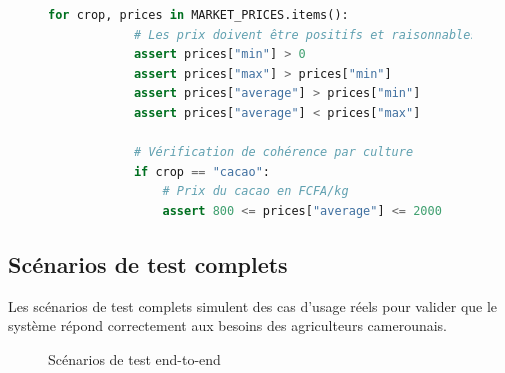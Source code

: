 \begin{figure}[H]
\begin{lstlisting}[language=Python, caption=Suite de tests d'intégration]
        for crop, prices in MARKET_PRICES.items():
            # Les prix doivent être positifs et raisonnables
            assert prices["min"] > 0
            assert prices["max"] > prices["min"]
            assert prices["average"] > prices["min"]
            assert prices["average"] < prices["max"]

            # Vérification de cohérence par culture
            if crop == "cacao":
                # Prix du cacao en FCFA/kg
                assert 800 <= prices["average"] <= 2000
\end{lstlisting}
\end{figure}

\subsection{Scénarios de test complets}

Les scénarios de test complets simulent des cas d'usage réels pour valider que le système répond correctement aux besoins des agriculteurs camerounais.

\begin{figure}[H]
\centering
{}
\caption{Scénarios de test end-to-end}
\end{figure}

